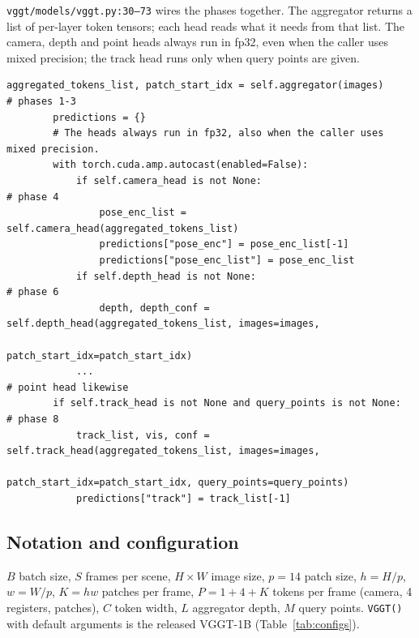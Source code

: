 \documentclass[11pt,a4paper]{article}
\newcommand{\src}[1]{\texttt{\small #1}}
\begin{document}
\src{vggt/models/vggt.py:30--73} wires the phases together. The aggregator returns a list of per-layer token tensors; each
head reads what it needs from that list. The camera, depth and point heads always run in fp32, even when the caller uses
mixed precision; the track head runs only when query points are given.

\begin{lstlisting}[firstnumber=44]
        aggregated_tokens_list, patch_start_idx = self.aggregator(images)            # phases 1-3
        predictions = {}
        # The heads always run in fp32, also when the caller uses mixed precision.
        with torch.cuda.amp.autocast(enabled=False):
            if self.camera_head is not None:                                         # phase 4
                pose_enc_list = self.camera_head(aggregated_tokens_list)
                predictions["pose_enc"] = pose_enc_list[-1]
                predictions["pose_enc_list"] = pose_enc_list
            if self.depth_head is not None:                                          # phase 6
                depth, depth_conf = self.depth_head(aggregated_tokens_list, images=images,
                                                    patch_start_idx=patch_start_idx)
            ...                                                                      # point head likewise
        if self.track_head is not None and query_points is not None:                 # phase 8
            track_list, vis, conf = self.track_head(aggregated_tokens_list, images=images,
                                                    patch_start_idx=patch_start_idx, query_points=query_points)
            predictions["track"] = track_list[-1]
\end{lstlisting}

\subsection{Notation and configuration}

$B$ batch size, $S$ frames per scene, $H\times W$ image size, $p=14$ patch size, $h=H/p$, $w=W/p$, $K=hw$ patches per frame,
$P = 1 + 4 + K$ tokens per frame (camera, 4 registers, patches), $C$ token width, $L$ aggregator depth, $M$ query points.
\texttt{VGGT()} with default arguments is the released VGGT-1B (Table~\ref{tab:configs}).
\end{document}
